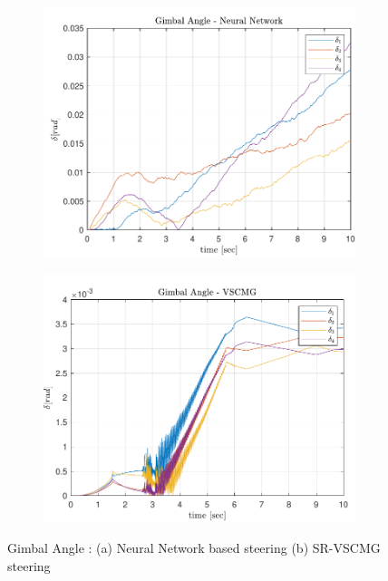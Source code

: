 \begin{figure}[ht]
     \centering
     \begin{subfigure}[b]{0.49\textwidth}
         \centering
         \includegraphics[width=\textwidth]{figures/plots/Results/vs-nn-delta.pdf}
          \caption{}
         \label{fig:nn_delta}
     \end{subfigure}
     \begin{subfigure}[b]{0.49\textwidth}
         \centering
         \includegraphics[width=\textwidth]{figures/plots/Results/vs-vs-delta.pdf}
          \caption{}
         \label{fig:vs_delta}
     \end{subfigure}
     
        \caption{Gimbal Angle : (a) Neural Network based steering (b) SR-VSCMG steering}
        \label{fig:nnvscmg_delta}
\end{figure}


